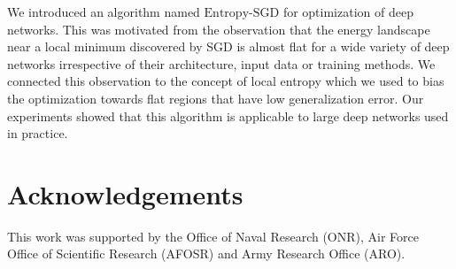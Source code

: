 \documentclass[10pt]{article}
\newcommand{\entropysgd}{\mathrm{Entropy}\textrm{-}\mathrm{SGD}}
\begin{document}
We introduced an algorithm named $\entropysgd$ for optimization of deep networks. This was motivated from the observation that the energy landscape near a local minimum discovered by SGD is almost flat for a wide variety of deep networks irrespective of their architecture, input data or training methods. We connected this observation to the concept of local entropy which we used to bias the optimization towards flat regions that have low generalization error. Our experiments showed that this algorithm is applicable to large deep networks used in practice.

\section{Acknowledgements}
\label{s:acknowledgements}

This work was supported by the Office of Naval Research (ONR), Air Force Office of Scientific Research (AFOSR) and Army Research Office (ARO).

{
\footnotesize


}
\end{document}
